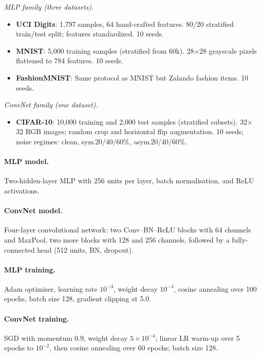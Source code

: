 \documentclass[11pt]{article}
\begin{document}
\textit{MLP family (three datasets).}
\begin{itemize}
  \item \textbf{UCI Digits}: 1,797 samples, 64 hand-crafted features.
    80/20 stratified train/test split; features standardized.
    10 seeds.
  \item \textbf{MNIST}: 5,000 training samples (stratified from 60k).
    28$\times$28 grayscale pixels flattened to 784 features.
    10 seeds.
  \item \textbf{FashionMNIST}: Same protocol as MNIST but Zalando fashion items.
    10 seeds.
\end{itemize}

\textit{ConvNet family (one dataset).}
\begin{itemize}
  \item \textbf{CIFAR-10}: 10,000 training and 2,000 test samples (stratified
    subsets).
    32$\times$32 RGB images; random crop and horizontal flip augmentation.
    10 seeds; noise regimes: clean, sym\,20/40/60\%, asym\,20/40/60\%.
\end{itemize}

\paragraph{MLP model.}
Two-hidden-layer MLP with 256 units per layer, batch normalisation, and ReLU
activations.

\paragraph{ConvNet model.}
Four-layer convolutional network: two Conv--BN--ReLU blocks with 64 channels
and MaxPool, two more blocks with 128 and 256 channels, followed by a
fully-connected head (512 units, BN, dropout).

\paragraph{MLP training.}
Adam optimiser, learning rate $10^{-3}$, weight decay $10^{-4}$, cosine
annealing over 100 epochs, batch size 128, gradient clipping at 5.0.

\paragraph{ConvNet training.}
SGD with momentum 0.9, weight decay $5\times10^{-4}$; linear LR warm-up over
5 epochs to $10^{-2}$, then cosine annealing over 60 epochs; batch size 128.
\end{document}
